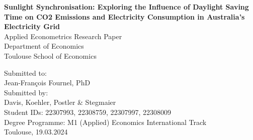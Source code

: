 \begin{titlepage}

\begin{center}

\vspace*{1,2cm}

\huge {\bfseries Sunlight Synchronisation: Exploring the Influence of Daylight Saving Time on CO2 Emissions and Electricity Consumption in Australia’s Electricity Grid}\\[1.8cm]

\Large {Applied Econometrics Research Paper}\\[1cm]

\large {Department of Economics}\\[0.2cm]

\large {Toulouse School of Economics}\\[0.5cm]

\end{center}

\vfill

\noindent Submitted to:\\
Jean-François Fournel, PhD\\[0.7cm]
Submitted by:\\
Davis, Koehler, Postler \& Stegmaier\\[0.7cm]
Student IDs: 
22307993, %
22308759, %
22307997, %
22308009 %
\\
Degree Programme: M1 (Applied) Economics International Track \\[0.7cm]
Toulouse, 19.03.2024

\setcounter{page}{0}

\end{titlepage}